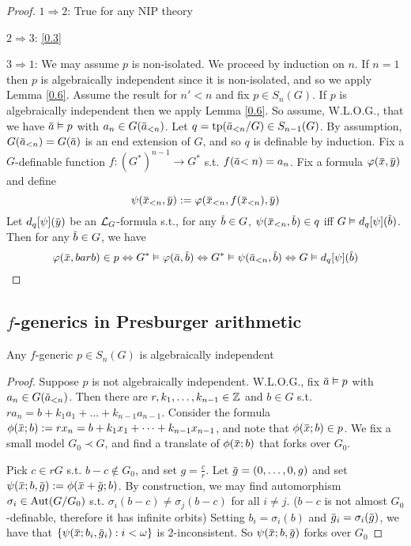 \documentclass[11pt]{article}
\begin{document}
\begin{proof}
\(1\Rightarrow 2\): True for any NIP theory

\(2\Rightarrow 3\): \ref{0.3}

\(3\Rightarrow 1\): We may assume \(p\) is non-isolated. We proceed by induction on \(n\). If \(n=1\)
then \(p\) is algebraically independent since it is non-isolated, and so we apply Lemma \ref{0.6}.
Assume the result for \(n'<n\) and fix \(p\in S_n(G)\). If \(p\) is algebraically independent then
we apply Lemma \ref{0.6}. So assume, W.L.O.G., that we have \(\bara\vDash p\)
with \(a_n\in G(\bara_{<n})\). Let \(q=\tp(\bara_{<n}/G)\in S_{n-1}(G)\). By
assumption, \(G(\bara_{<n})=G(\bara)\) is an end extension of \(G\), and so \(q\) is definable
by induction. Fix a \(G\)-definable function \(f:(G^*)^{n-1}\to G^*\) s.t. \(f(\bara{<n})=a_n\).
Fix a formula \(\varphi(\barx,\bary)\) and define
\begin{equation*}
\psi(\barx_{<n},\bary):=\varphi(\barx_{<n},f(\barx_{<n}),\bary)
\end{equation*}
Let \(d_q[\psi](\bary)\) be an \(\mathcal{L}_G\)-formula s.t., for
any \(\barb\in G\), \(\psi(\barx_{<n},\barb)\in q\) iff \(G\vDash d_q[\psi](\barb)\). Then for
any \(\barb\in G\), we have
\begin{equation*}
\varphi(\barx,barb)\in p\Leftrightarrow G^*\vDash\varphi(\bara,\barb)\Leftrightarrow G^*\vDash\psi(\bara_{<n},\barb)\Leftrightarrow
G\vDash d_q[\psi](\barb)
\end{equation*}
\end{proof}
\subsection{\texorpdfstring{\(f\)}{f}-generics in Presburger arithmetic}
\label{sec:orgf054ee5}
\begin{proposition}[]
Any \(f\)-generic \(p\in S_n(G)\) is algebraically independent
\end{proposition}

\begin{proof}
Suppose \(p\) is not algebraically independent. W.L.O.G., fix \(\bara\vDash p\)
with \(a_n\in G(\bara_{<n})\). Then there are \(r,k_1,\dots,k_{n-1}\in\mathbb{Z}\) and \(b\in G\)
s.t. \(ra_n=b+k_1a_1+\dots+k_{n-1}a_{n-1}\). Consider the
formula \(\phi(\barx;b):=rx_n=b+k_1x_1+\dots+k_{n-1}x_{n-1}\), and note that \(\phi(\barx;b)\in p\). We fix a
small model \(G_0\prec G\), and find a translate of \(\phi(\barx;b)\) that forks over \(G_0\).

Pick \(c\in rG\) s.t. \(b-c\notin G_0\), and set \(g=\frac{c}{r}\). Let \(\barg=(0,\dots,0,g)\) and
set \(\psi(\barx;b,\barg):=\phi(\barx+\barg;b)\). By construction, we may find
automorphism \(\sigma_i\in\operatorname{\text{Aut}}(G/G_0)\) s.t. \(\sigma_i(b-c)\neq\sigma_j(b-c)\) for all \(i\neq j\). (\(b-c\) is
not almost \(G_0\)-definable, therefore it has infinite orbits)
Setting \(b_i=\sigma_i(b)\) and \(\barg_i=\sigma_i(\barg)\), we have that \(\{\psi(\barx;b_i,\barg_i):i<\omega\}\) is
2-inconsistent. So \(\psi(\barx;b,\barg)\) forks over \(G_0\)
\end{proof}
\end{document}
